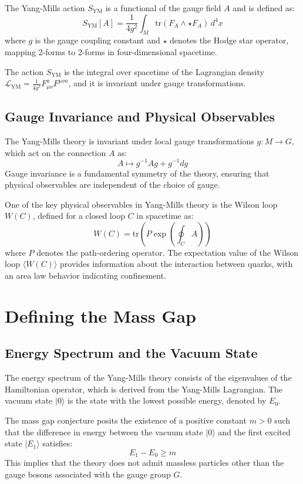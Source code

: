 \documentclass[11pt]{article}
\begin{document}
The Yang-Mills action \( S_{\text{YM}} \) is a functional of the gauge field \( A \) and is defined as:
\[
S_{\text{YM}}[A] = \frac{1}{4g^2} \int_M \text{tr}(F_A \wedge \star F_A) \, d^4x
\]
where \( g \) is the gauge coupling constant and \( \star \) denotes the Hodge star operator, mapping 2-forms to 2-forms in four-dimensional spacetime.

The action \( S_{\text{YM}} \) is the integral over spacetime of the Lagrangian density \( \mathcal{L}_{\text{YM}} = \frac{1}{4g^2} F_{\mu\nu}^a F^{\mu\nu a} \), and it is invariant under gauge transformations.

\subsection{Gauge Invariance and Physical Observables}
The Yang-Mills theory is invariant under local gauge transformations \( g: M \to G \), which act on the connection \( A \) as:
\[
A \mapsto g^{-1} A g + g^{-1} dg
\]
Gauge invariance is a fundamental symmetry of the theory, ensuring that physical observables are independent of the choice of gauge.

One of the key physical observables in Yang-Mills theory is the Wilson loop \( W(C) \), defined for a closed loop \( C \) in spacetime as:
\[
W(C) = \text{tr}\left( P \exp \left( \oint_C A \right) \right)
\]
where \( P \) denotes the path-ordering operator. The expectation value of the Wilson loop \( \langle W(C) \rangle \) provides information about the interaction between quarks, with an area law behavior indicating confinement.

\section{Defining the Mass Gap}
\subsection{Energy Spectrum and the Vacuum State}
The energy spectrum of the Yang-Mills theory consists of the eigenvalues of the Hamiltonian operator, which is derived from the Yang-Mills Lagrangian. The vacuum state \( |0\rangle \) is the state with the lowest possible energy, denoted by \( E_0 \).

The mass gap conjecture posits the existence of a positive constant \( m > 0 \) such that the difference in energy between the vacuum state \( |0\rangle \) and the first excited state \( |E_1\rangle \) satisfies:
\[
E_1 - E_0 \geq m
\]
This implies that the theory does not admit massless particles other than the gauge bosons associated with the gauge group \( G \).
\end{document}
